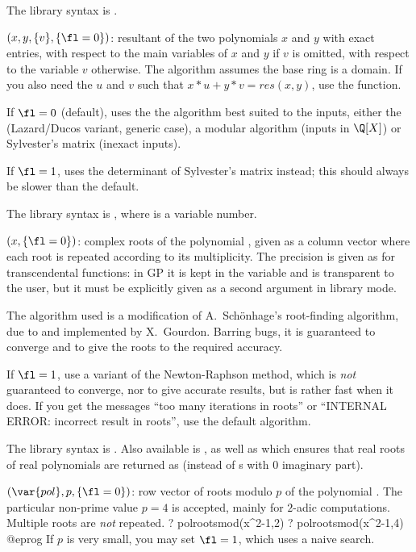 The library syntax is .

$(x,y,\{v\},\{\fl=0\})$: \label{se:polresultant}resultant of the two
polynomials $x$ and $y$ with exact entries, with respect to the main
variables of $x$ and $y$ if $v$ is omitted, with respect to the variable $v$
otherwise. The algorithm assumes the base ring is a domain. If you also need
the $u$ and $v$ such that $x*u + y*v = res(x,y)$, use the 
function.

If $\fl=0$ (default), uses the the algorithm best suited to the inputs,
either the  (Lazard/Ducos variant, generic case),
a modular algorithm (inputs in $\Q[X]$) or Sylvester's matrix (inexact
inputs).

If $\fl=1$, uses the determinant of Sylvester's matrix instead; this should
always be slower than the default.

The library syntax is , where  is a variable number.

$(x,\{\fl=0\})$: \label{se:polroots}complex roots of the polynomial
, given as a column vector where each root is repeated according to
its multiplicity. The precision is given as for transcendental functions: in
GP it is kept in the variable  and is transparent to the
user, but it must be explicitly given as a second argument in library mode.

The algorithm used is a modification of A.~Sch\"onhage's
root-finding algorithm, due to and implemented by X.~Gourdon. Barring bugs, it
is guaranteed to converge and to give the roots to the required accuracy.

If $\fl=1$, use a variant of the Newton-Raphson method, which is \emph{not}
guaranteed to converge, nor to give accurate results, but is rather
fast when it does. If you get the messages ``too many iterations in roots''
or ``INTERNAL ERROR: incorrect result in roots'', use the default algorithm.

The library syntax is .
Also available is , as well as
 which ensures that real roots of
real polynomials are returned as  (instead of s with
0 imaginary part).

$(\var{pol},p,\{\fl=0\})$: \label{se:polrootsmod}row vector of roots modulo $p$ of the polynomial . The
particular non-prime value $p=4$ is accepted, mainly for $2$-adic
computations. Multiple roots are \emph{not} repeated.
\bprog
? polrootsmod(x^2-1,2)
? polrootsmod(x^2-1,4)
@eprog\noindent
If $p$ is very small, you may set $\fl=1$, which uses a naive search.

